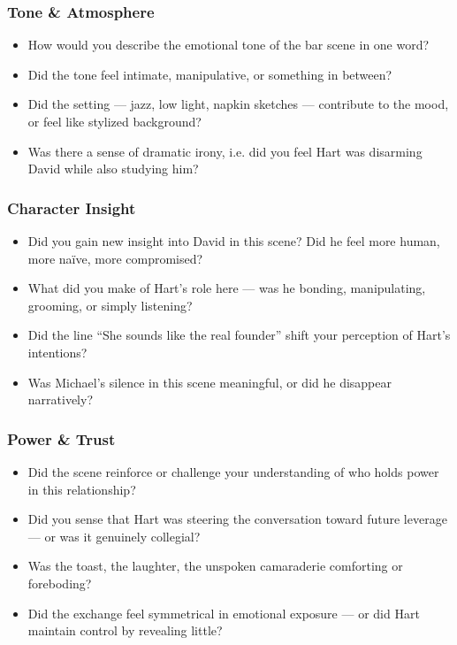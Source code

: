 \subsubsection*{Tone \& Atmosphere}

\begin{itemize}
\item How would you describe the emotional tone of the bar scene in one word?
\item Did the tone feel intimate, manipulative, or something in between?
\item Did the setting — jazz, low light, napkin sketches — contribute to the mood, or feel like stylized background?
\item Was there a sense of dramatic irony, i.e. did you feel Hart was disarming David while also studying him?
\end{itemize}

\subsubsection*{Character Insight}

\begin{itemize}
\item Did you gain new insight into David in this scene? Did he feel more human, more naïve, more compromised?
\item What did you make of Hart’s role here — was he bonding, manipulating, grooming, or simply listening?
\item Did the line “She sounds like the real founder” shift your perception of Hart’s intentions?
\item Was Michael’s silence in this scene meaningful, or did he disappear narratively?
\end{itemize}

\subsubsection*{Power \& Trust}

\begin{itemize}
\item Did the scene reinforce or challenge your understanding of who holds power in this relationship?
\item Did you sense that Hart was steering the conversation toward future leverage — or was it genuinely collegial?
\item Was the toast, the laughter, the unspoken camaraderie comforting or foreboding?
\item Did the exchange feel symmetrical in emotional exposure — or did Hart maintain control by revealing little?
\end{itemize}

